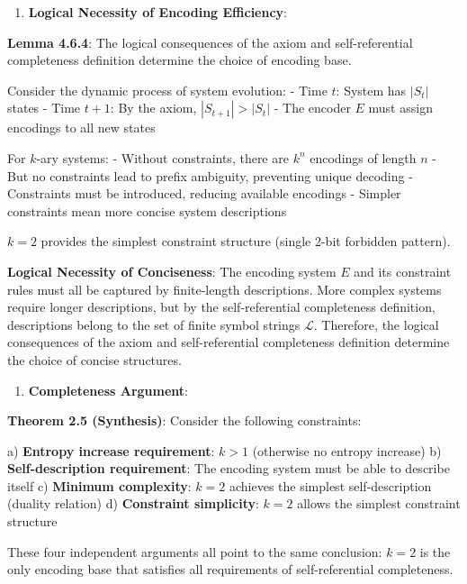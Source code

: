 \begin{enumerate}
\item \textbf{Logical Necessity of Encoding Efficiency}:
\end{enumerate}
   
   \textbf{Lemma 4.6.4}: The logical consequences of the axiom and self-referential completeness definition determine the choice of encoding base.
\label{lemma:2.5.3}
   
   Consider the dynamic process of system evolution:
   - Time $t$: System has $|S_t|$ states
   - Time $t+1$: By the axiom, $|S_{t+1}| > |S_t|$
   - The encoder $E$ must assign encodings to all new states
   
   For $k$-ary systems:
   - Without constraints, there are $k^n$ encodings of length $n$
   - But no constraints lead to prefix ambiguity, preventing unique decoding
   - Constraints must be introduced, reducing available encodings
   - Simpler constraints mean more concise system descriptions
   
   $k=2$ provides the simplest constraint structure (single 2-bit forbidden pattern).
   
   \textbf{Logical Necessity of Conciseness}: The encoding system $E$ and its constraint rules must all be captured by finite-length descriptions. More complex systems require longer descriptions, but by the self-referential completeness definition, descriptions belong to the set of finite symbol strings $\mathcal{L}$. Therefore, the logical consequences of the axiom and self-referential completeness definition determine the choice of concise structures.
   
\begin{enumerate}
\item \textbf{Completeness Argument}:
\end{enumerate}
   
   \textbf{Theorem 2.5 (Synthesis)}: Consider the following constraints:
   
   a) \textbf{Entropy increase requirement}: $k > 1$ (otherwise no entropy increase)
   b) \textbf{Self-description requirement}: The encoding system must be able to describe itself
   c) \textbf{Minimum complexity}: $k=2$ achieves the simplest self-description (duality relation)
   d) \textbf{Constraint simplicity}: $k=2$ allows the simplest constraint structure
   
   These four independent arguments all point to the same conclusion: $k=2$ is the only encoding base that satisfies all requirements of self-referential completeness.
   
